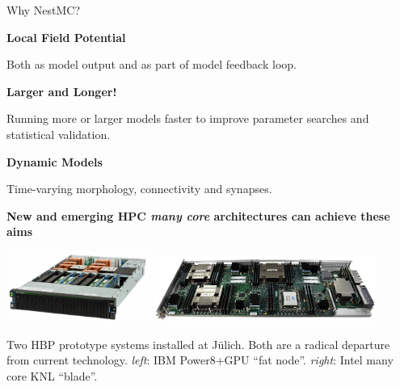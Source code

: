 \documentclass[a0paper,portrait]{baposter}
\newcommand{\julich}{J\"ulich\xspace}
\newcommand{\centerheader}[1]{\begin{center}\bfseries\Large{#1}\end{center} \vspace{-6pt}}
\newcommand{\imageheader}[1]{\begin{center}\bfseries\large{#1}\end{center} \vspace{-2pt}}
\newcommand{\newemph}[1]{{\color{blue!40!black}\em #1}}
\begin{document}
\begin{poster}
\begin{posterbox}[name=motivation,column=0,row=0,span=2]{Why NestMC?}
    \begin{minipage}[t]{0.3\textwidth}
        \centerheader{Local Field Potential}
        \vspace{4pt}
        \centering
        Both as model output and as part of model feedback loop.
    \end{minipage}
    \hfill
    \begin{minipage}[t]{0.3\textwidth}
        \centerheader{Larger and Longer!}
        \vspace{4pt}
        \centering
        Running more or larger models faster to improve parameter searches and statistical validation.
    \end{minipage}
    \hfill
    \begin{minipage}[t]{0.3\textwidth}
        \vspace{0pt}
        \centerheader{Dynamic Models}
        \vspace{12pt}
        \centering
        Time-varying morphology, connectivity and synapses.
    \end{minipage}

    \imageheader{New and emerging HPC \newemph{many core} architectures can achieve these aims}

    \hfill
    \includegraphics[width=0.35\textwidth]{images/juron.jpg}
    \hfill
    \includegraphics[width=0.55\textwidth]{images/knlnode.jpg}
    \hspace{0.5cm}

    \begin{center}
        Two HBP prototype systems  installed at \julich. Both are a radical departure from current technology.
        \newemph{left}: IBM Power8+GPU ``fat node''. \newemph{right}: Intel many core KNL ``blade''.
    \end{center}


\end{posterbox}
\end{poster}
\end{document}
